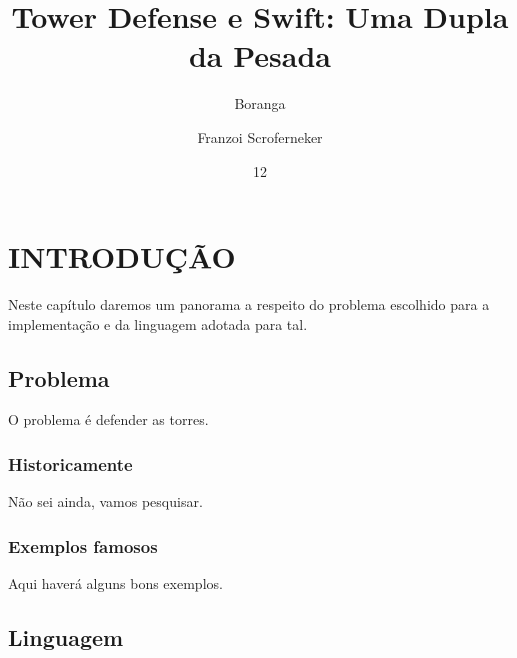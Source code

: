 \documentclass[rel_mlp]{iiufrgs}
\title{Tower Defense e Swift: Uma Dupla da Pesada}
\author{Boranga}{Augusto} %
\author{Franzoi Scroferneker}{Rodrigo} %
\date{12}{2017}
\begin{document}
\maketitle


\tableofcontents








%

\chapter{INTRODUÇÃO} \label{intro}

Neste capítulo daremos um panorama a respeito do problema escolhido para a implementação e da linguagem adotada para tal.



\section{Problema}

O problema é defender as torres.


\subsection{Historicamente}

Não sei ainda, vamos pesquisar.

\subsection{Exemplos famosos}

Aqui haverá alguns bons exemplos.




\section{Linguagem}
\end{document}
